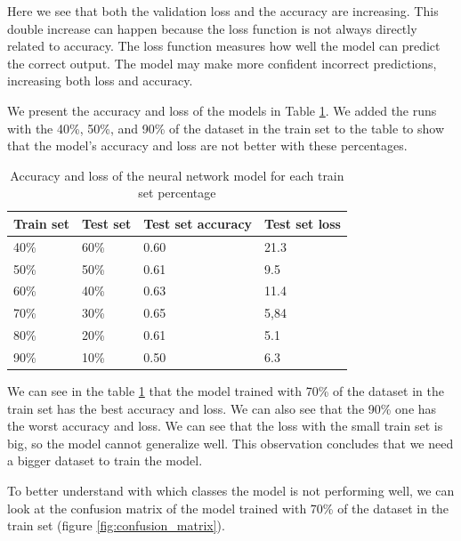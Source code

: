 Here we see that both the validation loss and the accuracy are increasing. This double increase can happen because the loss function is not always directly related to accuracy. The loss function measures how well the model can predict the correct output. The model may make more confident incorrect predictions, increasing both loss and accuracy. 

We present the accuracy and loss of the models in Table \ref{tab:neural_network_results}. We added the runs with the 40\%, 50\%, and 90\% of the dataset in the train set to the table to show that the model's accuracy and loss are not better with these percentages.

\begin{table}[H]
    \centering
    \begin{tabular}{|l|l|l|l|}
    \hline
    \textbf{Train set} & \textbf{Test set} & \textbf{Test set accuracy} & \textbf{Test set loss} \\ \hline
    40\%               & 60\%              & 0.60              & 21.3        \\ \hline
    50\%               & 50\%              & 0.61              & 9.5         \\ \hline
    60\%               & 40\%              & 0.63              & 11.4        \\ \hline
    70\%               & 30\%              & 0.65              & 5,84        \\ \hline
    80\%               & 20\%              & 0.61              & 5.1         \\ \hline
    90\%               & 10\%              & 0.50              & 6.3         \\ \hline
    \end{tabular}
    \caption{Accuracy and loss of the neural network model for each train set percentage}
    \label{tab:neural_network_results}
\end{table}

We can see in the table \ref{tab:neural_network_results} that the model trained with 70\% of the dataset in the train set has the best accuracy and loss. We can also see that the 90\% one has the worst accuracy and loss. We can see that the loss with the small train set is big, so the model cannot generalize well. This observation concludes that we need a bigger dataset to train the model.

To better understand with which classes the model is not performing well, we can look at the confusion matrix of the model trained with 70\% of the dataset in the train set (figure \ref{fig:confusion_matrix}).

